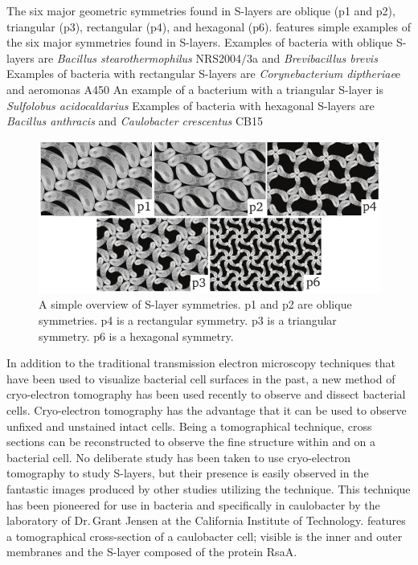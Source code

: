 The six major geometric symmetries found in \acp{S-layer} are oblique (p1 and p2), triangular (p3), rectangular (p4), and hexagonal (p6).  features simple
examples of the six major symmetries found in \acp{S-layer}. Examples of bacteria with oblique \acp{S-layer} are \textit{Bacillus stearothermophilus}
NRS2004$/$3a and \textit{Brevibacillus brevis} Examples of bacteria with rectangular \acp{S-layer} are
\textit{Corynebacterium diptheriae}e and \acl{aeromonas} A450 An example of a bacterium with a triangular \ac{S-layer}
is \textit{Sulfolobus acidocaldarius} Examples of bacteria with hexagonal \acp{S-layer} are \textit{Bacillus anthracis} and
\textit{Caulobacter crescentus} CB15

\begin{figure}[htb] %
  \begin{center}
    \includegraphics[]{intro/img/symmetries.pdf}
  \end{center}
  \caption[A simple overview of \ac{S-layer} symmetries]{A simple overview of \ac{S-layer} symmetries. p1 and p2 are oblique symmetries. p4 is a rectangular symmetry. p3 is a
triangular symmetry. p6 is a hexagonal symmetry.}
  \label{fig:symmetries}
\end{figure}
   
In addition to the traditional transmission electron microscopy techniques that have been used to visualize bacterial cell surfaces in the past, a new method of cryo-electron
tomography has been used recently to observe and dissect bacterial cells. Cryo-electron tomography has the advantage that it can be used to observe unfixed and unstained intact
cells. Being a tomographical technique, cross sections can be reconstructed to observe the fine structure within and on a bacterial cell. No deliberate study has been taken to use
cryo-electron tomography to study \acp{S-layer}, but their presence is easily observed in the fantastic images produced by other studies utilizing the technique. This technique has
been pioneered for use in bacteria and specifically in \acl{caulobacter} by the laboratory of Dr.\,Grant Jensen at the California Institute of Technology. 
features a tomographical cross-section of a \ac{caulobacter} cell; visible is the inner and outer membranes and the \ac{S-layer} composed of the protein RsaA.


